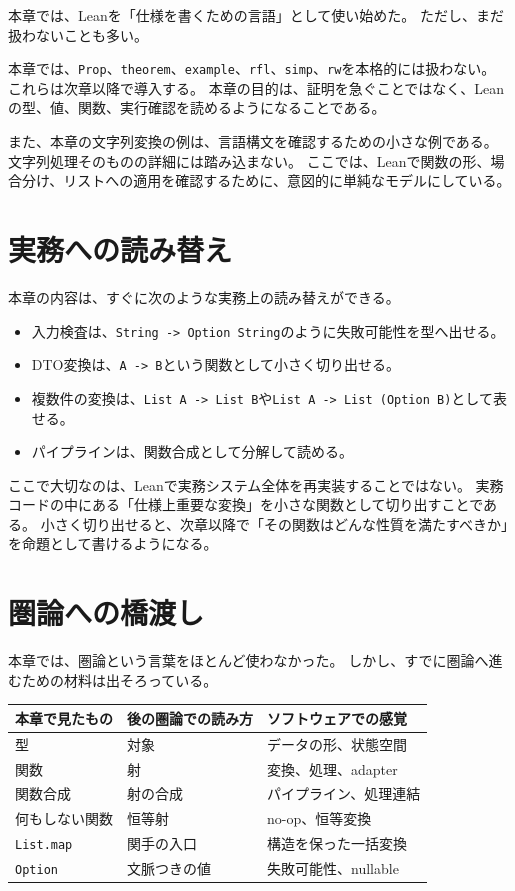 本章では、Leanを「仕様を書くための言語」として使い始めた。
ただし、まだ扱わないことも多い。

\begin{warningbox}
本章では、\texttt{Prop}、\texttt{theorem}、\texttt{example}、\texttt{rfl}、\texttt{simp}、\texttt{rw}を本格的には扱わない。
これらは次章以降で導入する。
本章の目的は、証明を急ぐことではなく、Leanの型、値、関数、実行確認を読めるようになることである。
\end{warningbox}

また、本章の文字列変換の例は、言語構文を確認するための小さな例である。
文字列処理そのものの詳細には踏み込まない。
ここでは、Leanで関数の形、場合分け、リストへの適用を確認するために、意図的に単純なモデルにしている。

\section{実務への読み替え}

本章の内容は、すぐに次のような実務上の読み替えができる。

\begin{itemize}
\item 入力検査は、\texttt{String -> Option String}のように失敗可能性を型へ出せる。
\item DTO変換は、\texttt{A -> B}という関数として小さく切り出せる。
\item 複数件の変換は、\texttt{List A -> List B}や\texttt{List A -> List (Option B)}として表せる。
\item パイプラインは、関数合成として分解して読める。
\end{itemize}

ここで大切なのは、Leanで実務システム全体を再実装することではない。
実務コードの中にある「仕様上重要な変換」を小さな関数として切り出すことである。
小さく切り出せると、次章以降で「その関数はどんな性質を満たすべきか」を命題として書けるようになる。

\section{圏論への橋渡し}

本章では、圏論という言葉をほとんど使わなかった。
しかし、すでに圏論へ進むための材料は出そろっている。

\begin{center}
\begin{tabular}{lll}
\toprule
本章で見たもの & 後の圏論での読み方 & ソフトウェアでの感覚 \\
\midrule
型 & 対象 & データの形、状態空間 \\
関数 & 射 & 変換、処理、adapter \\
関数合成 & 射の合成 & パイプライン、処理連結 \\
何もしない関数 & 恒等射 & no-op、恒等変換 \\
\texttt{List.map} & 関手の入口 & 構造を保った一括変換 \\
\texttt{Option} & 文脈つきの値 & 失敗可能性、nullable \\
\bottomrule
\end{tabular}
\end{center}

